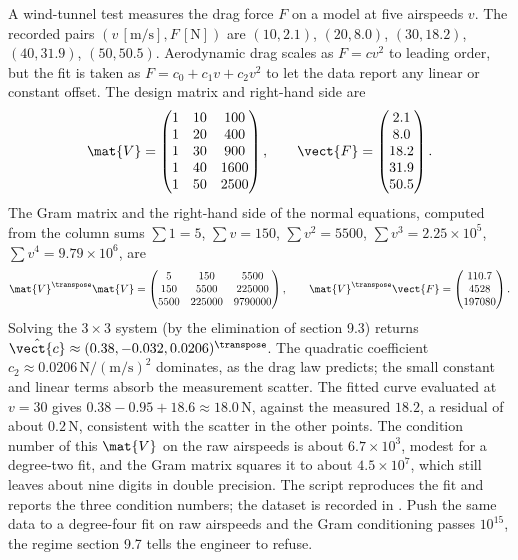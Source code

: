 A wind-tunnel test measures the drag force $F$ on a model at five
airspeeds $v$. The recorded pairs $(v\,[\si{\meter\per\second}],
F\,[\si{\newton}])$ are $(10, 2.1)$, $(20, 8.0)$, $(30, 18.2)$,
$(40, 31.9)$, $(50, 50.5)$. Aerodynamic drag scales as $F = c v^{2}$
to leading order, but the fit is taken as $F = c_{0} + c_{1} v +
c_{2} v^{2}$ to let the data report any linear or constant offset.
The design matrix and right-hand side are
\[
\mat{V} = \begin{pmatrix} 1 & 10 & 100 \\ 1 & 20 & 400 \\ 1 & 30 &
900 \\ 1 & 40 & 1600 \\ 1 & 50 & 2500 \end{pmatrix}, \qquad
\vect{F} = \begin{pmatrix} 2.1 \\ 8.0 \\ 18.2 \\ 31.9 \\ 50.5
\end{pmatrix}.
\]
The Gram matrix and the right-hand side of the normal equations,
computed from the column sums $\sum 1 = 5$, $\sum v = 150$, $\sum
v^{2} = 5500$, $\sum v^{3} = 2.25 \times 10^{5}$, $\sum v^{4} =
9.79 \times 10^{6}$, are
\[
\mat{V}^{\transpose}\mat{V} = \begin{pmatrix} 5 & 150 & 5500 \\ 150
& 5500 & 225000 \\ 5500 & 225000 & 9790000 \end{pmatrix}, \qquad
\mat{V}^{\transpose}\vect{F} = \begin{pmatrix} 110.7 \\ 4528 \\
197080 \end{pmatrix}.
\]
Solving the $3 \times 3$ system (by the elimination of section 9.3)
returns $\hat{\vect{c}} \approx (0.38, -0.032, 0.0206)^{\transpose}$.
The quadratic coefficient $c_{2} \approx 0.0206\,\si{\newton}/
(\si{\meter\per\second})^{2}$ dominates, as the drag law predicts;
the small constant and linear terms absorb the measurement scatter.
The fitted curve evaluated at $v = 30$ gives $0.38 - 0.95 + 18.6
\approx 18.0\,\si{\newton}$, against the measured $18.2$, a residual
of about $0.2\,\si{\newton}$, consistent with the scatter in the
other points. The condition number of this $\mat{V}$ on the raw
airspeeds is about $6.7 \times 10^{3}$, modest for a degree-two fit,
and the Gram matrix squares it to about $4.5 \times 10^{7}$, which
still leaves about nine digits in double precision. The script
 reproduces the fit and
reports the three condition numbers; the dataset is recorded in
. Push the same data to a degree-four fit on
raw airspeeds and the Gram conditioning passes $10^{15}$, the regime
section 9.7 tells the engineer to refuse.

